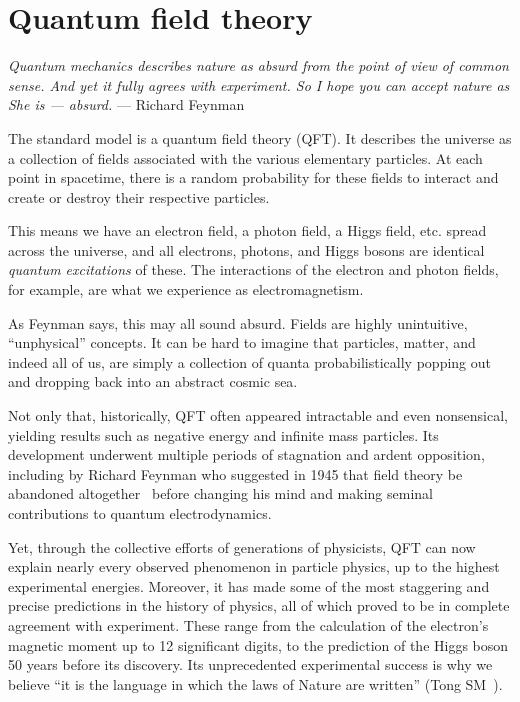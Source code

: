 \chapter{Quantum field theory}
\label{sec:01_qft}

\begin{center}
	\centering
	\noindent
	\textit{Quantum mechanics describes nature as absurd from the point of view of common sense. And yet it fully agrees with experiment. So I hope you can accept nature as She is --- absurd.} --- Richard Feynman
\end{center}

The standard model is a quantum field theory (QFT).
It describes the universe as a collection of fields associated with the various elementary particles.
At each point in spacetime, there is a random probability for these fields to interact and create or destroy their respective particles.

This means we have an electron field, a photon field, a Higgs field, etc. spread across the universe, and all electrons, photons, and Higgs bosons are identical \textit{quantum excitations} of these.
The interactions of the electron and photon fields, for example, are what we experience as electromagnetism.

As Feynman says, this may all sound absurd.
Fields are highly unintuitive, ``unphysical'' concepts.
It can be hard to imagine that particles, matter, and indeed all of us, are simply a collection of quanta probabilistically popping out and dropping back into an abstract cosmic sea.

Not only that, historically, QFT often appeared intractable and even nonsensical, yielding results such as negative energy and infinite mass particles.
Its development underwent multiple periods of stagnation and ardent opposition, including by Richard Feynman who suggested in 1945 that field theory be abandoned altogether~\cite{WeinbergHistoryQFT} before changing his mind and making seminal contributions to quantum electrodynamics.

Yet, through the collective efforts of generations of physicists, QFT can now explain nearly every observed phenomenon in particle physics, up to the highest experimental energies.
Moreover, it has made some of the most staggering and precise predictions in the history of physics, all of which proved to be in complete agreement with experiment.
These range from the calculation of the electron's magnetic moment up to 12 significant digits, to the prediction of the Higgs boson 50 years before its discovery.
Its unprecedented experimental success is why we believe ``it is the language in which the laws of Nature are written'' (Tong SM~\cite{TongSM}).

